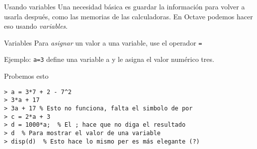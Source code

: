 \begin{frame}[fragile]{Usando variables}
  Una necesidad básica es guardar la información para volver a usarla después, como las memorias de las calculadoras. En Octave podemos hacer eso usando \emph{variables}.

  \begin{alertblock}{Variables}
    Para \emph{asignar} un valor a una variable, use el operador \verb!=!
    
    Ejemplo: \verb!a=3! define una variable a y le asigna el valor numérico tres.
  \end{alertblock}

\end{frame}
\begin{frame}[fragile]{Probemos esto} %
\begin{lstlisting}
> a = 3*7 + 2 - 7^2
> 3*a + 17
> 3a + 17 % Esto no funciona, falta el simbolo de por
> c = 2*a + 3
> d = 1000*a;  % El ; hace que no diga el resultado
> d  % Para mostrar el valor de una variable
> disp(d)  % Esto hace lo mismo per es más elegante (?)
\end{lstlisting}
\end{frame}


